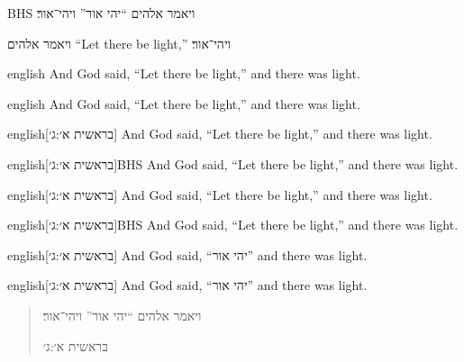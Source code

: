 \documentclass[12pt]{article}
\begin{document}
\begin{displaycquote}[בראשית א׳:ג׳]{BHS}
  ויאמר אלהים \enquote{יהי אור} ויהי־אור׃
\end{displaycquote}

\begin{displayquote}[בראשית א׳:ג׳]
  ויאמר אלהים \foreignquote{english}{Let there be light,} ויהי־אור׃
\end{displayquote}

\begin{foreigndisplayquote}{english}
  And God said, \enquote{Let there be light,} and there was light.
\end{foreigndisplayquote}

\begin{hyphendisplayquote}{english}
  And God said, \enquote{Let there be light,} and there was light.
\end{hyphendisplayquote}

\begin{foreigndisplayquote}{english}[בראשית א׳:ג׳]
  And God said, \enquote{Let there be light,} and there was light.
\end{foreigndisplayquote}

\begin{foreigndisplaycquote}{english}[בראשית א׳:ג׳]{BHS}
  And God said, \enquote{Let there be light,} and there was light.
\end{foreigndisplaycquote}

\begin{hyphendisplayquote}{english}[בראשית א׳:ג׳]
  And God said, \enquote{Let there be light,} and there was light.
\end{hyphendisplayquote}

\begin{hyphendisplaycquote}{english}[בראשית א׳:ג׳]{BHS}
  And God said, \enquote{Let there be light,} and there was light.
\end{hyphendisplaycquote}

\begin{foreigndisplayquote}{english}[בראשית א׳:ג׳]
  And God said, \foreignquote{hebrew}{יהי אור} and there was light.
\end{foreigndisplayquote}

\begin{hyphendisplayquote}{english}[בראשית א׳:ג׳]
  And God said, \foreignquote{hebrew}{יהי אור} and there was light.
\end{hyphendisplayquote}

\blockquote[בראשית א׳:ג׳]{ויאמר אלהים \enquote{יהי אור} ויהי־אור׃}
\end{document}
